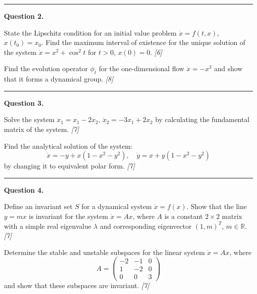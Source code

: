 \documentclass[11pt,a4paper]{article}
\newcommand{\pts}[1]{\hfill   \textit{[#1]}}
\begin{document}
\medskip\rule{\linewidth}{0.2pt}

\medskip


\noindent   \textbf{Question 2.}

\begin{parts}
  \item State the Lipschitz condition for an initial value problem $\dot{x} = f(t, x)$, $x(t_0) = x_0$. Find the maximum interval of existence for the unique solution of the system $\dot{x} = x^2 + \cos^2 t$ for $t > 0$, $x(0) = 0$. \pts{6}
  \item Find the evolution operator $\phi_t$ for the one-dimensional flow $\dot{x} = -x^3$ and show that it forms a dynamical group. \pts{8}
\end{parts}

\medskip\rule{\linewidth}{0.2pt}

\medskip


\noindent   \textbf{Question 3.}

\begin{parts}
  \item Solve the system $\dot{x}_1 = x_1 - 2x_2$, $\dot{x}_2 = -3x_1 + 2x_2$ by calculating the fundamental matrix of the system. \pts{7}
  \item Find the analytical solution of the system:
  \[
  \dot{x} = -y + x(1-x^2-y^2), \quad \dot{y} = x + y(1-x^2-y^2)
  \]
  by changing it to equivalent polar form. \pts{7}
\end{parts}

\medskip\rule{\linewidth}{0.2pt}

\medskip


\noindent   \textbf{Question 4.}

\begin{parts}
  \item Define an invariant set $S$ for a dynamical system $\dot{x} = f(x)$. Show that the line $y = mx$ is invariant for the system $\dot{x} = Ax$, where $A$ is a constant $2 \times 2$ matrix with a simple real eigenvalue $\lambda$ and corresponding eigenvector $(1, m)^T$, $m \in \mathbb{R}$. \pts{7}
  \item Determine the stable and unstable subspaces for the linear system $\dot{x} = Ax$, where
  \[
  A = 
\begin{pmatrix} -2 & -1 & 0 \\ 1 & -2 & 0 \\ 0 & 0 & 3 \end{pmatrix}
  \]
  and show that these subspaces are invariant. \pts{7}
\end{parts}
\end{document}
